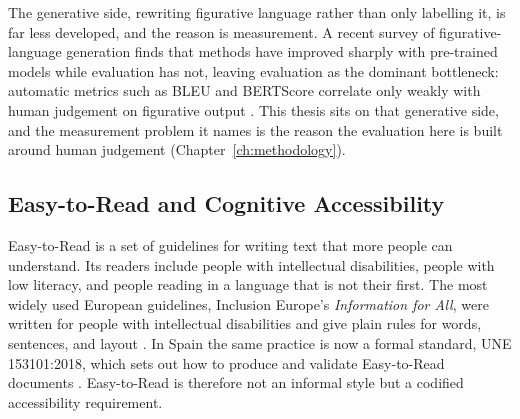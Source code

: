 The generative side, rewriting figurative language rather than only labelling
it, is far less developed, and the reason is measurement. A recent survey of
figurative-language generation finds that methods have improved sharply with
pre-trained models while evaluation has not, leaving evaluation as the dominant
bottleneck: automatic metrics such as BLEU and BERTScore correlate only weakly
with human judgement on figurative output \cite{Lai2024}. This thesis sits on
that generative side, and the measurement problem it names is the reason the
evaluation here is built around human judgement (Chapter~\ref{ch:methodology}).

\subsection{Easy-to-Read and Cognitive Accessibility}

Easy-to-Read is a set of guidelines for writing text that more people can
understand. Its readers include people with intellectual disabilities, people
with low literacy, and people reading in a language that is not their first.
The most widely used European guidelines, Inclusion Europe's \textit{Information
for All}, were written for people with intellectual disabilities and give plain
rules for words, sentences, and layout \cite{InclusionEurope2009}. In Spain the
same practice is now a formal standard, UNE 153101:2018, which sets out how to
produce and validate Easy-to-Read documents \cite{UNE2018}. Easy-to-Read is
therefore not an informal style but a codified accessibility requirement.

